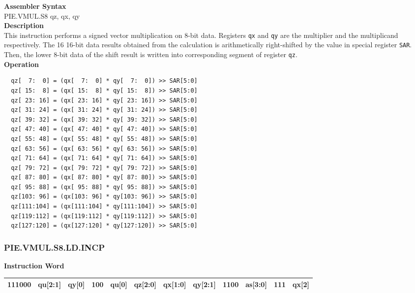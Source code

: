 \textbf{Assembler Syntax} \\
PIE.VMUL.S8 qz, qx, qy \\
\textbf{Description} \\
This instruction performs a signed vector multiplication on 8-bit data. Registers \lstinline{qx} and \lstinline{qy} are the multiplier and the multiplicand respectively. The 16 16-bit data results obtained from the calculation is arithmetically right-shifted by the value in special register \lstinline{SAR}. Then, the lower 8-bit data of the shift result is written into corresponding segment of register \lstinline{qz}.\\
\textbf{Operation}
\begin{lstlisting}
  qz[  7:  0] = (qx[  7:  0] * qy[  7:  0]) >> SAR[5:0]
  qz[ 15:  8] = (qx[ 15:  8] * qy[ 15:  8]) >> SAR[5:0]
  qz[ 23: 16] = (qx[ 23: 16] * qy[ 23: 16]) >> SAR[5:0]
  qz[ 31: 24] = (qx[ 31: 24] * qy[ 31: 24]) >> SAR[5:0]
  qz[ 39: 32] = (qx[ 39: 32] * qy[ 39: 32]) >> SAR[5:0]
  qz[ 47: 40] = (qx[ 47: 40] * qy[ 47: 40]) >> SAR[5:0]
  qz[ 55: 48] = (qx[ 55: 48] * qy[ 55: 48]) >> SAR[5:0]
  qz[ 63: 56] = (qx[ 63: 56] * qy[ 63: 56]) >> SAR[5:0]
  qz[ 71: 64] = (qx[ 71: 64] * qy[ 71: 64]) >> SAR[5:0]
  qz[ 79: 72] = (qx[ 79: 72] * qy[ 79: 72]) >> SAR[5:0]
  qz[ 87: 80] = (qx[ 87: 80] * qy[ 87: 80]) >> SAR[5:0]
  qz[ 95: 88] = (qx[ 95: 88] * qy[ 95: 88]) >> SAR[5:0]
  qz[103: 96] = (qx[103: 96] * qy[103: 96]) >> SAR[5:0]
  qz[111:104] = (qx[111:104] * qy[111:104]) >> SAR[5:0]
  qz[119:112] = (qx[119:112] * qy[119:112]) >> SAR[5:0]
  qz[127:120] = (qx[127:120] * qy[127:120]) >> SAR[5:0]
\end{lstlisting}

\newpage
\subsubsection{PIE.VMUL.S8.LD.INCP}\label{instruction:PIEVMULS8LDINCP}
\setlength\tabcolsep{6pt}
\textbf{Instruction Word} \\
\begin{tabular}{|c|c|c|c|c|c|c|c|c|c|c|c|}
	\hline
	111000 & qu[2:1] & qy[0] & 100 & qu[0] & qz[2:0] & qx[1:0] & qy[2:1] & 1100 & as[3:0] & 111 & qx[2] \\
	\hline
\end{tabular}

